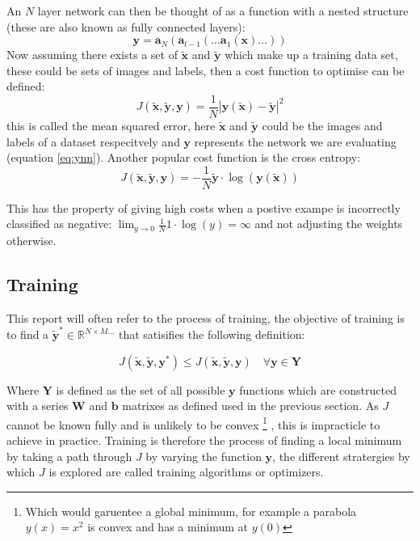     An $N$ layer network can then be thought of as a function with a nested
    structure (these are also known as fully connected layers):
    \begin{equation} \label{eq:ynn}
      \mathbf{y} = \mathbf{a}_{N}(\mathbf{a}_{l-1}(...\mathbf{a}_1(\mathbf{x})...))
    \end{equation}
    Now assuming there exists a set of $\tilde{\mathbf{x}}$ and $\tilde{\mathbf{y}}$ which make
    up a training data set, these could be sets of images and labels, then a cost function
    to optimise can be defined:
    \begin{equation}
      J(\tilde{\mathbf{x}},\tilde{\mathbf{y}},\mathbf{y}) = \frac{1}{N}\left |\mathbf{y}(\tilde{\mathbf{x}})-\tilde{\mathbf{y}}\right | ^2
    \end{equation}
    this is called the mean squared error, here $\tilde{\mathbf{x}}$ and $\tilde{\mathbf{y}}$ could
    be the images and labels of a dataset respecitvely and $\mathbf{y}$ represents the network we are evaluating (equation \ref{eq:ynn}). Another popular cost function is
    the cross entropy:
    \begin{equation}
      J(\tilde{\mathbf{x}},\tilde{\mathbf{y}},\mathbf{y}) = -\frac{1}{N}\tilde{\mathbf{y}}\cdot\log(\mathbf{y}(\tilde{\mathbf{x}}))
    \end{equation}

    This has the property of giving high costs when a postive exampe is incorrectly classified as negative: $\lim _{y\rightarrow0}\frac{1}{N}1\cdot \log(y) = \infty$
    and not adjusting the weights otherwise.

  \subsection{Training}
      This report will often refer to the process of training, the objective of training is to find
      a $\tilde{\mathbf{y}}^* \in \mathbb{R}^{N\times M...}$ that satisifies the following definition:

      \begin{equation}
        J(\tilde{\mathbf{x}},\tilde{\mathbf{y}},\mathbf{y}^*) \leq J(\tilde{\mathbf{x}},\tilde{\mathbf{y}},\mathbf{y}) \quad \forall \mathbf{y} \in \mathbf{Y}
      \end{equation}

      Where $\mathbf{Y}$ is defined as the set of all possible $\mathbf{y}$ functions which are constructed with a series $\mathbf{W}$ and $\mathbf{b}$ matrixes as defined used in the previous section.
      As $J$ cannot be known fully and is unlikely to be convex \footnote{Which would garuentee a global minimum, for example a parabola $y(x)=x^2$ is convex and has a minimum at $y(0)$}
      , this is impracticle to achieve in practice.
      Training is therefore the process of finding a local minimum by taking a path through $J$ by varying
      the function $ \mathbf{y} $, the different stratergies by which $J$ is explored are called
      training algorithms or optimizers.

